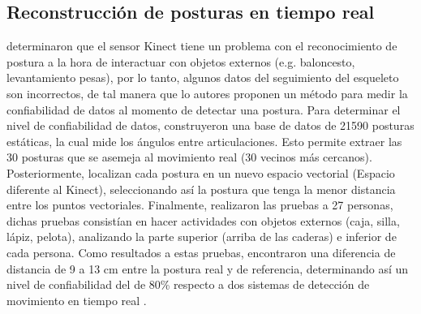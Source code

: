 \subsection{Reconstrucci\'on de posturas en tiempo real} \label{tr:2}
 determinaron que el sensor Kinect tiene un problema con el reconocimiento de postura a la hora de interactuar con objetos externos (e.g. baloncesto, levantamiento pesas), por lo tanto, algunos datos del seguimiento del esqueleto son incorrectos, de tal manera que lo autores proponen un m\'etodo para medir la confiabilidad de datos al momento de detectar una postura.
\medbreak
Para determinar el nivel de confiabilidad de datos,  construyeron una base de datos de 21590 posturas est\'aticas, la cual mide los \'angulos entre articulaciones. Esto permite  extraer las 30 posturas que se asemeja al movimiento real (30 vecinos m\'as cercanos).  Posteriormente, localizan cada postura en un nuevo espacio vectorial (Espacio diferente al Kinect), seleccionando as\'i la postura que tenga la menor distancia entre los puntos vectoriales.
\medbreak
Finalmente,  realizaron las pruebas a 27 personas, dichas pruebas consist\'ian en hacer actividades con objetos externos (caja, silla, l\'apiz, pelota), analizando la parte superior (arriba de las caderas) e inferior de cada persona. Como resultados a estas pruebas, encontraron una diferencia de distancia de 9 a 13 cm entre la postura real y de referencia, determinando as\'i un nivel de confiabilidad del de 80\% respecto a dos sistemas de detecci\'on de movimiento en tiempo real \cite{shum2011fast,shum2012real}.
